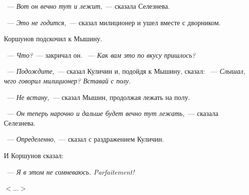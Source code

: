 ~--- \textit{Вот он вечно тут и лежит},~--- сказала Селезнева.

~--- \textit{Это не годится},~--- сказал милиционер и ушел вместе с дворником.

Коршунов подскочил к Мышину.

~--- \textit{Что?}~--- закричал он. ~--- \textit{Как вам это по вкусу пришлось?}

~--- \textit{Подождите},~--- сказал Куличин и, подойдя к Мышину, сказал: ~--- \textit{Слышал, чего говорил милиционер? Вставай с полу.}

~--- \textit{Не встану},~--- сказал Мышин, продолжая лежать на полу.

~--- \textit{Он теперь нарочно и дальше будет вечно тут лежать},~--- сказала Селезнева.

~--- \textit{Определенно},~--- сказал с раздражением Куличин.

И Коршунов сказал:

~--- \textit{Я в этом не сомневаюсь. Parfaitement!}

\begin{flushright}
	$<\dots>$
\end{flushright}